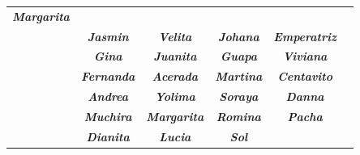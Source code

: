 \begin{table}[H]
{\begin{tabular}{|c|ccccc|}
  \textit{\textbf{Margarita}} \\ \cline{2-6} 
\rowcolor[HTML]{C0C0C0} 
\multirow{-4}{*}{\cellcolor[HTML]{000000}{\color[HTML]{FFFFFF} \textit{\textbf{1}}}} &
  \multicolumn{1}{c|}{\cellcolor[HTML]{C0C0C0}\textit{\textbf{Jasmin}}} &
  \multicolumn{1}{c|}{\cellcolor[HTML]{C0C0C0}\textit{\textbf{Velita}}} &
  \multicolumn{1}{c|}{\cellcolor[HTML]{C0C0C0}\textit{\textbf{Johana}}} &
  \multicolumn{1}{c|}{\cellcolor[HTML]{C0C0C0}\textit{\textbf{Emperatriz}}} &
  \textit{\textbf{}} \\ \hline
\rowcolor[HTML]{A3E1F3} 
\cellcolor[HTML]{1122C6}{\color[HTML]{FFFFFF} } &
  \multicolumn{1}{c|}{\cellcolor[HTML]{A3E1F3}\textit{\textbf{Gina}}} &
  \multicolumn{1}{c|}{\cellcolor[HTML]{A3E1F3}\textit{\textbf{Juanita}}} &
  \multicolumn{1}{c|}{\cellcolor[HTML]{A3E1F3}\textit{\textbf{Guapa}}} &
  \multicolumn{1}{c|}{\cellcolor[HTML]{A3E1F3}\textit{\textbf{Viviana}}} &
  \textit{\textbf{}} \\ \cline{2-6} 
\rowcolor[HTML]{A3E1F3} 
\cellcolor[HTML]{1122C6}{\color[HTML]{FFFFFF} } &
  \multicolumn{1}{c|}{\cellcolor[HTML]{A3E1F3}\textit{\textbf{Fernanda}}} &
  \multicolumn{1}{c|}{\cellcolor[HTML]{A3E1F3}\textit{\textbf{Acerada}}} &
  \multicolumn{1}{c|}{\cellcolor[HTML]{A3E1F3}\textit{\textbf{Martina}}} &
  \multicolumn{1}{c|}{\cellcolor[HTML]{A3E1F3}\textit{\textbf{Centavito}}} &
  \textit{\textbf{}} \\ \cline{2-6} 
\rowcolor[HTML]{A3E1F3} 
\cellcolor[HTML]{1122C6}{\color[HTML]{FFFFFF} } &
  \multicolumn{1}{c|}{\cellcolor[HTML]{A3E1F3}\textit{\textbf{Andrea}}} &
  \multicolumn{1}{c|}{\cellcolor[HTML]{A3E1F3}\textit{\textbf{Yolima}}} &
  \multicolumn{1}{c|}{\cellcolor[HTML]{A3E1F3}\textit{\textbf{Soraya}}} &
  \multicolumn{1}{c|}{\cellcolor[HTML]{A3E1F3}\textit{\textbf{Danna}}} &
  \textit{\textbf{}} \\ \cline{2-6} 
\rowcolor[HTML]{A3E1F3} 
\cellcolor[HTML]{1122C6}{\color[HTML]{FFFFFF} } &
  \multicolumn{1}{c|}{\cellcolor[HTML]{A3E1F3}\textit{\textbf{Muchira}}} &
  \multicolumn{1}{c|}{\cellcolor[HTML]{A3E1F3}\textit{\textbf{Margarita}}} &
  \multicolumn{1}{c|}{\cellcolor[HTML]{A3E1F3}\textit{\textbf{Romina}}} &
  \multicolumn{1}{c|}{\cellcolor[HTML]{A3E1F3}\textit{\textbf{Pacha}}} &
  \textit{\textbf{}} \\ \cline{2-6} 
\rowcolor[HTML]{A3E1F3} 
\cellcolor[HTML]{1122C6}{\color[HTML]{FFFFFF} } &
  \multicolumn{1}{c|}{\cellcolor[HTML]{A3E1F3}\textit{\textbf{Dianita}}} &
  \multicolumn{1}{c|}{\cellcolor[HTML]{A3E1F3}\textit{\textbf{Lucia}}} &
  \multicolumn{1}{c|}{\cellcolor[HTML]{A3E1F3}\textit{\textbf{Sol}}} &

\end{tabular}}
\end{table}
